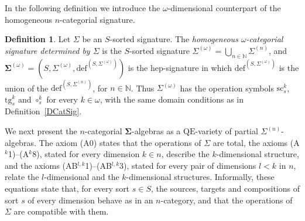 \documentclass[a4paper, reqno]{amsbook}
\newcommand{\sig}[1]{\mathbf{#1}}             %
\newcommand{\QE}{\mathrm{QE}}
\newcommand{\src}{\mathrm{sc}}
\newcommand{\tgt}{\mathrm{tg}}
\theoremstyle{plain}
\theoremstyle{definition}
\newtheorem{definition}[theorem]{Definition}
\begin{document}
In the following definition we introduce the $\omega$-dimensional counterpart of the homogeneous $n$-categorial signature.

\begin{definition}\label{DCatSigOmega}
Let $\Sigma$ be an $S$-sorted signature.
The \emph{homogeneous $\omega$-categorial signature determined by $\Sigma$} is the $S$-sorted signature $\Sigma^{(\omega)}=\bigcup_{n\in\mathbb{N}}\Sigma^{(n)}$, and $\sig{\Sigma}^{(\omega)}=(S,\Sigma^{(\omega)},\mathrm{def}^{(S,\Sigma^{(\omega)})})$ is the hep-signature in which $\mathrm{def}^{(S,\Sigma^{(\omega)})}$ is the union of the $\mathrm{def}^{(S,\Sigma^{(n)})}$, for $n\in\mathbb{N}$.
Thus $\Sigma^{(\omega)}$ has the operation symbols $\src^{k}_{s}$, $\tgt^{k}_{s}$ and $\circ^{k}_{s}$ for every $k\in\omega$, with the same domain conditions as in Definition~\ref{DCatSig}.
\end{definition}

We next present the $n$-categorial $\sig{\Sigma}$-algebras as a $\QE$-variety of partial $\Sigma^{(n)}$-algebras.
The axiom (A0) states that the operations of $\Sigma$ are total, the axioms (A$^{k}$1)--(A$^{k}$8), stated for every dimension $k\in n$, describe the $k$-dimensional structure, and the axioms (AB$^{l,k}$1)--(AB$^{l,k}$3), stated for every pair of dimensions $l<k$ in $n$, relate the $l$-dimensional and the $k$-dimensional structures.
Informally, these equations state that, for every sort $s\in S$, the sources, targets and compositions of sort $s$ of every dimension behave as in an $n$-category, and that the operations of $\Sigma$ are compatible with them.
\end{document}
